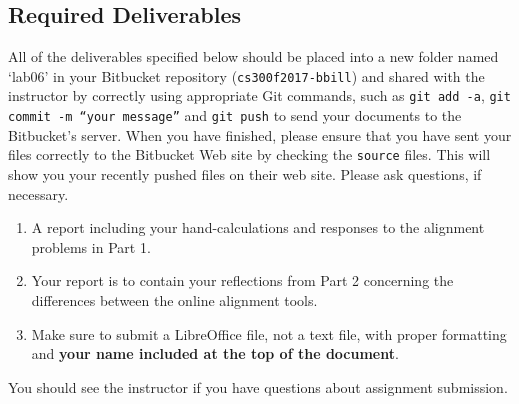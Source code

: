 \vspace*{-.1in}
\subsection*{Required Deliverables}
\vspace*{-.1in}
All of the deliverables specified below should be placed into a new folder named `lab06' in your Bitbucket repository ({\tt cs300f2017-bbill})  and shared with the instructor by correctly using  appropriate Git commands, such as {\tt git add -a}, {\tt git commit -m ``your message''} and {\tt git push} to send your documents to the Bitbucket's server. When you have finished, please ensure that you have sent your files correctly to the Bitbucket Web site by checking the {\tt source} files. This will show you your recently pushed files on their web site. Please ask questions, if necessary.
\color{red}
\begin{enumerate}
	\item A report including your hand-calculations and responses to the alignment problems in Part 1.
		
	\item Your report is to contain your reflections from Part 2 concerning the differences between the online alignment tools.
	\item Make sure to submit a LibreOffice file, not a text file, with proper formatting and \textbf{your name included at the top of the document}.
\end{enumerate}
\color{black}

\noindent You should see the instructor if you have questions about assignment submission.




